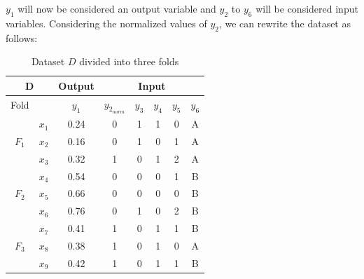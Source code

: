 \documentclass{article}
\begin{document}
$y_1$ will now be considered an output variable and $y_2$ to $y_6$ will be considered input variables.
Considering the normalized values of $y_2$, we can rewrite the dataset as follows:

\begin{table}[H]
\centering
\begin{tabular}{|cc|c|ccccc|}
\hline
\multicolumn{2}{|c|}{D}                              & Output & \multicolumn{5}{c|}{Input}                                                                                                         \\ \hline
\multicolumn{1}{|c|}{Fold}                   &       & $y_1$  & \multicolumn{1}{c|}{$y_{2_{norm}}$} & \multicolumn{1}{c|}{$y_3$} & \multicolumn{1}{c|}{$y_4$} & \multicolumn{1}{c|}{$y_5$} & $y_6$ \\ \hline
\multicolumn{1}{|c|}{\multirow{3}{*}{$F_1$}} & $x_1$ & 0.24   & \multicolumn{1}{c|}{0}              & \multicolumn{1}{c|}{1}     & \multicolumn{1}{c|}{1}     & \multicolumn{1}{c|}{0}     & A     \\ \cline{2-8} 
\multicolumn{1}{|c|}{}                       & $x_2$ & 0.16   & \multicolumn{1}{c|}{0}              & \multicolumn{1}{c|}{1}     & \multicolumn{1}{c|}{0}     & \multicolumn{1}{c|}{1}     & A     \\ \cline{2-8} 
\multicolumn{1}{|c|}{}                       & $x_3$ & 0.32   & \multicolumn{1}{c|}{1}              & \multicolumn{1}{c|}{0}     & \multicolumn{1}{c|}{1}     & \multicolumn{1}{c|}{2}     & A     \\ \hline
\multicolumn{1}{|c|}{\multirow{3}{*}{$F_2$}} & $x_4$ & 0.54   & \multicolumn{1}{c|}{0}              & \multicolumn{1}{c|}{0}     & \multicolumn{1}{c|}{0}     & \multicolumn{1}{c|}{1}     & B     \\ \cline{2-8} 
\multicolumn{1}{|c|}{}                       & $x_5$ & 0.66   & \multicolumn{1}{c|}{0}              & \multicolumn{1}{c|}{0}     & \multicolumn{1}{c|}{0}     & \multicolumn{1}{c|}{0}     & B     \\ \cline{2-8} 
\multicolumn{1}{|c|}{}                       & $x_6$ & 0.76   & \multicolumn{1}{c|}{0}              & \multicolumn{1}{c|}{1}     & \multicolumn{1}{c|}{0}     & \multicolumn{1}{c|}{2}     & B     \\ \hline
\multicolumn{1}{|c|}{\multirow{3}{*}{$F_3$}} & $x_7$ & 0.41   & \multicolumn{1}{c|}{1}              & \multicolumn{1}{c|}{0}     & \multicolumn{1}{c|}{1}     & \multicolumn{1}{c|}{1}     & B     \\ \cline{2-8} 
\multicolumn{1}{|c|}{}                       & $x_8$ & 0.38   & \multicolumn{1}{c|}{1}              & \multicolumn{1}{c|}{0}     & \multicolumn{1}{c|}{1}     & \multicolumn{1}{c|}{0}     & A     \\ \cline{2-8} 
\multicolumn{1}{|c|}{}                       & $x_9$ & 0.42   & \multicolumn{1}{c|}{1}              & \multicolumn{1}{c|}{0}     & \multicolumn{1}{c|}{1}     & \multicolumn{1}{c|}{1}     & B     \\ \hline
\end{tabular}
\caption{Dataset $D$ divided into three folds}
\label{tab:dataset2_folds}
\end{table}
\end{document}
